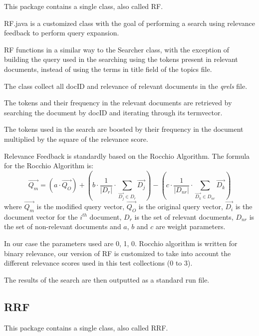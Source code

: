       This package contains a single class, also called RF.
        
        RF.java is a customized class with the goal of performing a search using relevance feedback to perform query expansion.
        
        RF functions in a similar way to the Searcher class, with the exception of building the query used in the searching using the tokens present in relevant documents, instead of using the terms in title field of the topics file.
        
        The class collect all docID and relevance of relevant documents in the \textit{qrels} file.
        
        The tokens and their frequency in the relevant documents are retrieved by searching the document by docID and iterating through its termvector.
        
        The tokens used in the search are boosted by their frequency in the document multiplied by the square of the relevance score.
        
        Relevance Feedback is standardly based on the Rocchio Algorithm.
        The formula for the Rocchio Algorithm is:
        $$
        \overrightarrow{Q_{m}}=
        \left(a\cdot\overrightarrow{Q_{O}}\right)+
        \left(b\cdot\frac{1}{|D_{r}|}\cdot\sum_{\overrightarrow{D_{j}}\in D_{r}}\overrightarrow{D_{j}}\right)-
        \left(c\cdot\frac{1}{|D_{nr}|}\cdot\sum_{\overrightarrow{D_{k}}\in D_{nr}}\overrightarrow{D_{k}}\right)
        $$
        where $\overrightarrow{Q_{m}}$ is the modified query vector, $\overrightarrow{Q_{O}}$ is the original query vector, $\overrightarrow{D_{i}}$ is the document vector for the $i^{th}$ document, $D_{r}$ is the set of relevant documents, $D_{nr}$ is the set of non-relevant documents and $a$, $b$ and $c$ are weight parameters.
        
        In our case the parameters used are 0, 1, 0.
        Rocchio algorithm is written for binary relevance, our version of RF is customized to take into account the different relevance scores used in this test collections (0 to 3).
        
        The results of the search are then outputted as a standard run file.
        
\subsection{RRF}
  
      This package contains a single class, also called RRF.
        
